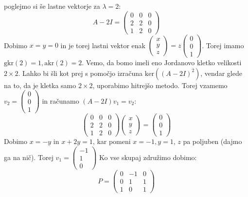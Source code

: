 \documentclass{article}
\begin{document}
\noindent poglejmo si še lastne vektorje za $\lambda = 2$:
\begin{equation*}
A-2I = 
\begin{pmatrix}
0 & 0 & 0 \\
2 & 2 & 0 \\
1 & 2 & 0
\end{pmatrix}
\end{equation*}
Dobimo $x=y=0$ in je torej lastni vektor enak  $\begin{pmatrix} x \\ y \\ z \end{pmatrix} = z \begin{pmatrix} 0 \\ 0 \\ 1 \end{pmatrix}$.
Torej imamo $\mathrm{gkr}(2) = 1, \mathrm{akr}(2) = 2$. Vemo, da bomo imeli eno Jordanovo kletko velikosti $2 \times 2$.
Lahko bi šli kot prej s pomočjo izračuna $\mathrm{ker} ((A-2I)^2)$, vendar glede na to, da je kletka samo $2 \times 2$, uporabimo hitrejšo metodo. Torej vzamemo
$v_2 = \begin{pmatrix} 0 \\ 0 \\ 1 \end{pmatrix}$ in računamo $(A-2I) v_1 = v_2$:
\begin{equation*}
\begin{pmatrix}
0 & 0 & 0 \\
2 & 2 & 0 \\
1 & 2 & 0
\end{pmatrix}
\begin{pmatrix} x \\ y \\ z
\end{pmatrix} =
\begin{pmatrix} 0 \\ 0 \\ 1 \end{pmatrix}
\end{equation*}
Dobimo $x=-y$ in $x+2y = 1$, kar pomeni $x=-1, y=1$, $z$ pa poljuben (dajmo ga na nič).
Torej $v_1 = \begin{pmatrix} -1 \\ 1 \\ 0 \end{pmatrix}$ 
Ko vse skupaj združimo dobimo:
\begin{equation*}
P = 
\begin{pmatrix}
0 & -1 & 0 \\
0 & 1 & 1 \\
1 & 0 & 1
\end{pmatrix}
\end{equation*}
\end{document}

